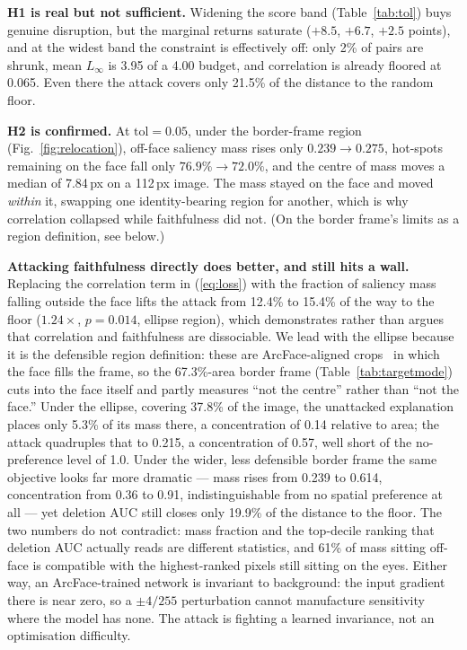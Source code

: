 \documentclass[conference,10pt]{IEEEtran}
\newcommand{\Linf}{L_\infty}
\begin{document}
\textbf{H1 is real but not sufficient.} Widening the score band (Table~\ref{tab:tol}) buys
genuine disruption, but the marginal returns saturate ($+8.5$, $+6.7$, $+2.5$ points), and at
the widest band the constraint is effectively off: only 2\% of pairs are shrunk, mean $\Linf$
is 3.95 of a 4.00 budget, and correlation is already floored at 0.065. Even there the attack
covers only 21.5\% of the distance to the random floor.

\textbf{H2 is confirmed.} At $\mathrm{tol} = 0.05$, under the border-frame region
(Fig.~\ref{fig:relocation}), off-face saliency mass rises only $0.239 \rightarrow 0.275$,
hot-spots remaining on the face fall only $76.9\% \rightarrow 72.0\%$, and the centre of mass
moves a median of 7.84\,px on a 112\,px image. The mass stayed on the face and moved
\emph{within} it, swapping one identity-bearing region for another, which is why correlation
collapsed while faithfulness did not. (On the border frame's limits as a region definition, see
below.)

\textbf{Attacking faithfulness directly does better, and still hits a wall.} Replacing the
correlation term in (\ref{eq:loss}) with the fraction of saliency mass falling outside the
face lifts the attack from 12.4\% to 15.4\% of the way to the floor ($1.24\times$, $p = 0.014$,
ellipse region), which demonstrates rather than argues that correlation and faithfulness are
dissociable. We lead with the ellipse because it is the defensible region definition: these are
ArcFace-aligned crops~\cite{deng2019arcface} in which the face fills the frame, so the
67.3\%-area border frame (Table~\ref{tab:targetmode}) cuts into the face itself and partly
measures ``not the centre'' rather than ``not the face.'' Under the ellipse, covering 37.8\% of
the image, the unattacked explanation places only 5.3\% of its mass there, a concentration of
0.14 relative to area; the attack quadruples that to 0.215, a concentration of 0.57, well short
of the no-preference level of 1.0. Under the wider, less defensible border frame the same
objective looks far more dramatic — mass rises from 0.239 to 0.614, concentration from 0.36 to
0.91, indistinguishable from no spatial preference at all — yet deletion AUC still closes only
19.9\% of the distance to the floor. The two numbers do not contradict: mass fraction and the
top-decile ranking that deletion AUC actually reads are different statistics, and 61\% of mass
sitting off-face is compatible with the highest-ranked pixels still sitting on the eyes. Either
way, an ArcFace-trained network is invariant to background: the input gradient there is near
zero, so a $\pm 4/255$ perturbation cannot manufacture sensitivity where the model has none.
The attack is fighting a learned invariance, not an optimisation difficulty.
\end{document}
